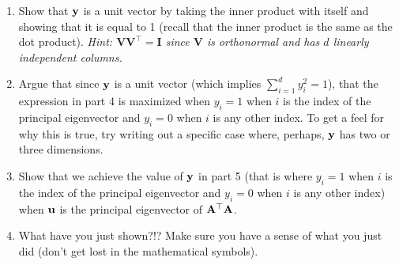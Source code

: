 \begin{prob}
\begin{enumerate}
\item Show that $\mathbf{y}$ is a unit vector by taking the inner product with itself and showing that it is equal to 1 (recall that the inner product is the same as the dot product).  \emph{Hint: $\mathbf{V} \mathbf{V}^\top = \mathbf{I}$ since $\mathbf{V}$ is orthonormal and has $d$ linearly independent columns.}

\item Argue that since $\mathbf{y}$ is a unit vector (which implies $\sum_{i=1}^d y_i^2 = 1$), that the expression in part 4 is maximized when $y_i = 1$ when $i$ is the index of the principal eigenvector and $y_i = 0$ when $i$ is any other index.  To get a feel for why this is true, try writing out a specific case where, perhaps, $\mathbf{y}$ has two or three dimensions.

\item Show that we achieve the value of $\mathbf{y}$ in part 5 (that is where $y_i = 1$ when $i$ is the index of the principal eigenvector and $y_i = 0$ when $i$ is any other index) when $\mathbf{u}$ is the principal eigenvector of $\mathbf{A}^\top \mathbf{A}$.

\item What have you just shown?!?  Make sure you have a sense of what you just did (don't get lost in the mathematical symbols).

\end{enumerate}

\end{prob}
